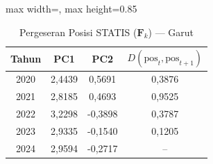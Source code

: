 \begin{table}[H]
\centering
\caption{Pergeseran Posisi STATIS ($\mathbf{F}_k$) --- Garut} \label{tab:app2jarak_statis_skor_garut}
\begin{adjustbox}{max width=\textwidth, max height=0.85\textheight}
\begin{tabular}{|c|c|c|c|}
\hline
\textbf{Tahun} & \textbf{PC1} & \textbf{PC2} & \textbf{$D(\text{pos}_t, \text{pos}_{t+1})$} \\
\hline
2020 & 2,4439 & 0,5691 & 0,3876 \\
2021 & 2,8185 & 0,4693 & 0,9525 \\
2022 & 3,2298 & -0,3898 & 0,3787 \\
2023 & 2,9335 & -0,1540 & 0,1205 \\
2024 & 2,9594 & -0,2717 & -- \\
\hline
\end{tabular}
\end{adjustbox}
\end{table}